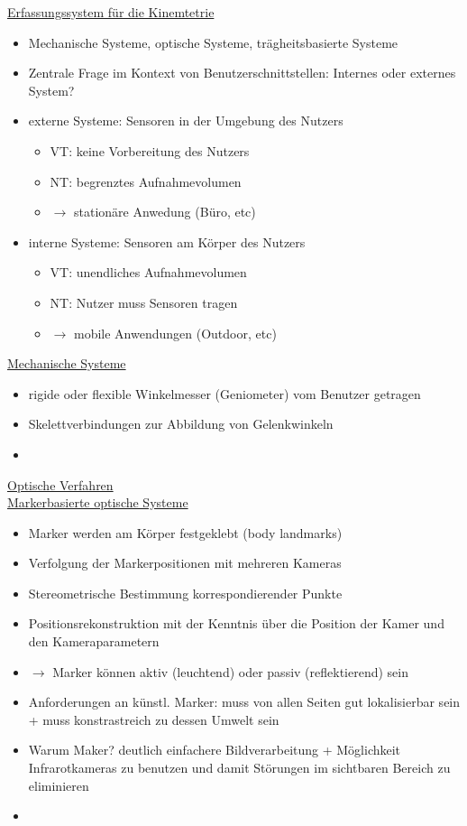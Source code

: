 \documentclass[a4paper,10pt,oneside]{article}
\begin{document}
\underline{Erfassungssystem für die Kinemtetrie} \\	
	\begin{itemize}
		\item Mechanische Systeme, optische Systeme, trägheitsbasierte Systeme
		\item Zentrale Frage im Kontext von Benutzerschnittstellen: Internes oder externes System?
		\item externe Systeme: Sensoren in der Umgebung des Nutzers
			\begin{itemize}
				\item VT: keine Vorbereitung des Nutzers
				\item NT: begrenztes Aufnahmevolumen
				\item $\rightarrow$ stationäre Anwedung (Büro, etc)
			\end{itemize}
		\item interne Systeme: Sensoren am Körper des Nutzers
			\begin{itemize}
				\item VT: unendliches Aufnahmevolumen
				\item NT: Nutzer muss Sensoren tragen
				\item $\rightarrow$ mobile Anwendungen (Outdoor, etc)
			\end{itemize}
	\end{itemize}
	
\underline{Mechanische Systeme} \\
	\begin{itemize}
		\item rigide oder flexible Winkelmesser (Geniometer) vom Benutzer getragen
		\item Skelettverbindungen zur Abbildung von Gelenkwinkeln
		\item[] %
	\end{itemize}

\underline{Optische Verfahren} \\
	
\underline{Markerbasierte optische Systeme} \\
	\begin{itemize}
		\item Marker werden am Körper festgeklebt (body landmarks)
		\item Verfolgung der Markerpositionen mit mehreren Kameras
		\item Stereometrische Bestimmung korrespondierender Punkte
		\item Positionsrekonstruktion mit der Kenntnis über die Position der Kamer und den Kameraparametern
		\item $\rightarrow$ Marker können aktiv (leuchtend) oder passiv (reflektierend) sein
		\item Anforderungen an künstl. Marker: muss von allen Seiten gut lokalisierbar sein + muss konstrastreich zu dessen Umwelt sein
		\item Warum Maker? deutlich einfachere Bildverarbeitung + Möglichkeit Infrarotkameras zu benutzen und damit Störungen im sichtbaren Bereich zu eliminieren
		\item[] %
	\end{itemize}
	
\end{document}
